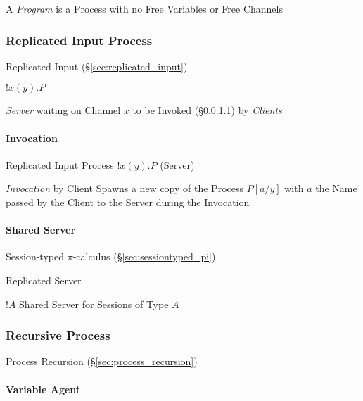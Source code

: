 A \emph{Program} is a Process with no Free Variables or Free Channels



\subsubsection{Replicated Input Process}
\label{sec:replicated_input_process}

Replicated Input (\S\ref{sec:replicated_input})

$!x(y).P$

\emph{Server} waiting on Channel $x$ to be Invoked
(\S\ref{sec:invocation}) by \emph{Clients}



\paragraph{Invocation}\label{sec:invocation}\hfill

Replicated Input Process $!x(y).P$ (Server)

\emph{Invocation} by Client Spawns a new copy of the Process $P[a/y]$
with $a$ the Name passed by the Client to the Server during the
Invocation



\paragraph{Shared Server}\label{sec:shared_server}\hfill

Session-typed $\pi$-calculus (\S\ref{sec:sessiontyped_pi})

Replicated Server

$!A$ Shared Server for Sessions of Type $A$



\subsubsection{Recursive Process}\label{sec:recursive_process}

Process Recursion (\S\ref{sec:process_recursion})



\paragraph{Variable Agent}\label{sec:variable_agent}\hfill



